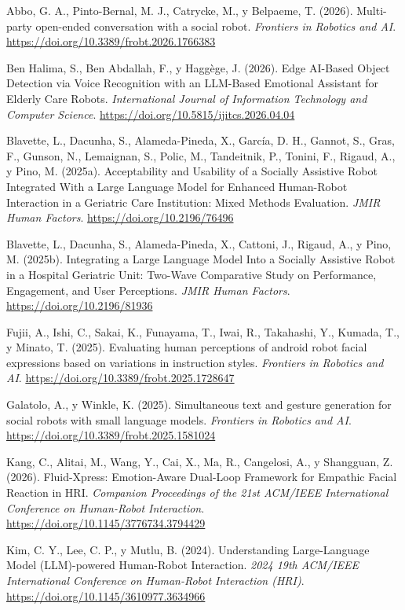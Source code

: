 Abbo, G. A., Pinto-Bernal, M. J., Catrycke, M., y Belpaeme, T. (2026). Multi-party open-ended conversation with a social robot. \textit{Frontiers in Robotics and AI}. \url{https://doi.org/10.3389/frobt.2026.1766383}

 Ben Halima, S., Ben Abdallah, F., y Haggège, J. (2026). Edge AI-Based Object Detection via Voice Recognition with an LLM-Based Emotional Assistant for Elderly Care Robots. \textit{International Journal of Information Technology and Computer Science}. \url{https://doi.org/10.5815/ijitcs.2026.04.04}

 Blavette, L., Dacunha, S., Alameda-Pineda, X., García, D. H., Gannot, S., Gras, F., Gunson, N., Lemaignan, S., Polic, M., Tandeitnik, P., Tonini, F., Rigaud, A., y Pino, M. (2025a). Acceptability and Usability of a Socially Assistive Robot Integrated With a Large Language Model for Enhanced Human-Robot Interaction in a Geriatric Care Institution: Mixed Methods Evaluation. \textit{JMIR Human Factors}. \url{https://doi.org/10.2196/76496}

 Blavette, L., Dacunha, S., Alameda-Pineda, X., Cattoni, J., Rigaud, A., y Pino, M. (2025b). Integrating a Large Language Model Into a Socially Assistive Robot in a Hospital Geriatric Unit: Two-Wave Comparative Study on Performance, Engagement, and User Perceptions. \textit{JMIR Human Factors}. \url{https://doi.org/10.2196/81936}

 Fujii, A., Ishi, C., Sakai, K., Funayama, T., Iwai, R., Takahashi, Y., Kumada, T., y Minato, T. (2025). Evaluating human perceptions of android robot facial expressions based on variations in instruction styles. \textit{Frontiers in Robotics and AI}. \url{https://doi.org/10.3389/frobt.2025.1728647}

 Galatolo, A., y Winkle, K. (2025). Simultaneous text and gesture generation for social robots with small language models. \textit{Frontiers in Robotics and AI}. \url{https://doi.org/10.3389/frobt.2025.1581024}

 Kang, C., Alitai, M., Wang, Y., Cai, X., Ma, R., Cangelosi, A., y Shangguan, Z. (2026). Fluid-Xpress: Emotion-Aware Dual-Loop Framework for Empathic Facial Reaction in HRI. \textit{Companion Proceedings of the 21st ACM/\allowbreak{}IEEE International Conference on Human-Robot Interaction}. \url{https://doi.org/10.1145/3776734.3794429}

 Kim, C. Y., Lee, C. P., y Mutlu, B. (2024). Understanding Large-Language Model (LLM)-powered Human-Robot Interaction. \textit{2024 19th ACM/\allowbreak{}IEEE International Conference on Human-Robot Interaction (HRI)}. \url{https://doi.org/10.1145/3610977.3634966}


